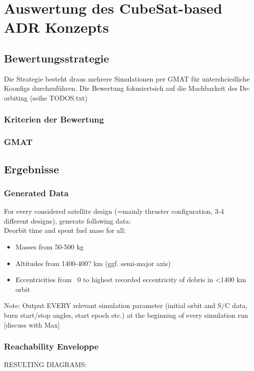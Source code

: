 \chapter{Auswertung des CubeSat-based ADR Konzepts}

\section{Bewertungsstrategie}
	Die Strategie besteht draus mehrere Simulationen per GMAT für untershciedliche Koonfigs durchzuführen. Die Bewertung fokusiertsich auf die Machbarkeit des De-orbiting (seihe TODOS.txt)\\

		\subsection{Kriterien der Bewertung}
					
		\subsection{GMAT}


\section{Ergebnisse}
	
		\subsection {Generated Data}
For every considered satellite design (=mainly thruster configuration, 3-4 different designs), generate following data: \\

Deorbit time and spent fuel mass for all:
\begin{itemize}
	\item Masses from 50-500 kg\\
	\item Altitudes from 1400-400? km  (ggf. semi-major axis) \\
	\item Eccentricities from ~0 to highest recorded eccentricity of debris in <1400 km orbit
\end{itemize}

Note: Output EVERY relevant simulation parameter (initial orbit and S/C data, burn start/stop angles, start epoch etc.)  at the beginning of every simulation run [discuss with Max]
	
			\subsection{Reachability Enveloppe}
RESULTING DIAGRAMS: \\

